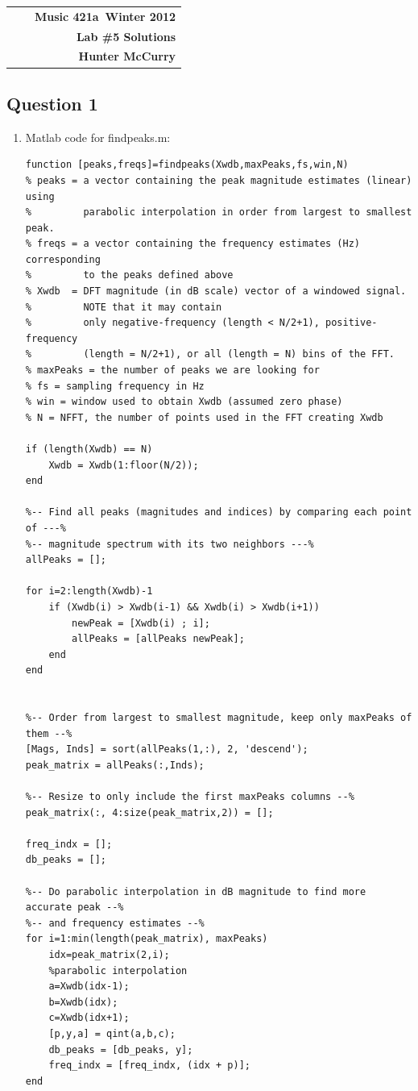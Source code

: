 \documentclass[11pt]{article}
\makeatletter
\newcommand{\course}{Music 421a}
\newcommand{\semester}{Winter 2012}
\newcommand{\hwk}{Lab \#5 Solutions}
\newcommand{\student}{Hunter McCurry}
\renewcommand\maketitle{
\begin{center}
\begin{tabular*}{6.44in}{l @{\extracolsep{\fill}}c r}
\bfseries  &  & \bfseries \course ~\semester \\
\bfseries&  & \bfseries  \hwk  \\
\bfseries   &   &  \bfseries \student \\ 
\end{tabular*}
\end{center} }
\makeatother
\begin{document}
\maketitle
\thispagestyle{plain}


\noindent 


\subsection*{Question 1}
\begin{enumerate}
\item Matlab code for findpeaks.m:

\begin{verbatim}
function [peaks,freqs]=findpeaks(Xwdb,maxPeaks,fs,win,N)
% peaks = a vector containing the peak magnitude estimates (linear) using
%         parabolic interpolation in order from largest to smallest peak.
% freqs = a vector containing the frequency estimates (Hz) corresponding
%         to the peaks defined above
% Xwdb  = DFT magnitude (in dB scale) vector of a windowed signal.
%         NOTE that it may contain
%         only negative-frequency (length < N/2+1), positive-frequency
%         (length = N/2+1), or all (length = N) bins of the FFT.
% maxPeaks = the number of peaks we are looking for
% fs = sampling frequency in Hz
% win = window used to obtain Xwdb (assumed zero phase)
% N = NFFT, the number of points used in the FFT creating Xwdb

if (length(Xwdb) == N)
    Xwdb = Xwdb(1:floor(N/2));
end

%-- Find all peaks (magnitudes and indices) by comparing each point of ---%
%-- magnitude spectrum with its two neighbors ---%
allPeaks = [];

for i=2:length(Xwdb)-1
    if (Xwdb(i) > Xwdb(i-1) && Xwdb(i) > Xwdb(i+1))
        newPeak = [Xwdb(i) ; i];
        allPeaks = [allPeaks newPeak];
    end
end


%-- Order from largest to smallest magnitude, keep only maxPeaks of them --%
[Mags, Inds] = sort(allPeaks(1,:), 2, 'descend');
peak_matrix = allPeaks(:,Inds);

%-- Resize to only include the first maxPeaks columns --%
peak_matrix(:, 4:size(peak_matrix,2)) = [];

freq_indx = [];
db_peaks = [];

%-- Do parabolic interpolation in dB magnitude to find more accurate peak --%
%-- and frequency estimates --%
for i=1:min(length(peak_matrix), maxPeaks)
    idx=peak_matrix(2,i);
    %parabolic interpolation
    a=Xwdb(idx-1);
    b=Xwdb(idx);
    c=Xwdb(idx+1);
    [p,y,a] = qint(a,b,c);
    db_peaks = [db_peaks, y];
    freq_indx = [freq_indx, (idx + p)];
end
    

\end{verbatim}
\end{enumerate}
\end{document}
